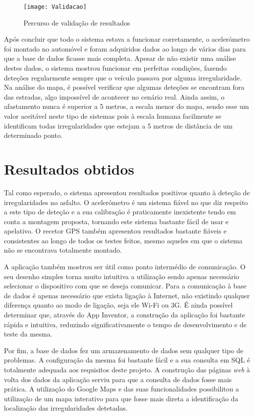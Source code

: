 \begin{figure}[htbp]
	\centering
	\texttt{[image: Validacao]}
	\caption{Percurso de validação de resultados}
	\label{fig:validacao}
\end{figure}

Após concluir que todo o sistema estava a funcionar corretamente, o acelerómetro foi montado no automóvel e foram adquiridos dados ao longo de vários dias para que a base de dados ficasse mais completa.
Apesar de não existir uma análise destes dados, o sistema mostrou funcionar em perfeitas condições, fazendo deteções regularmente sempre que o veículo passava por alguma irregularidade.
Na análise do mapa, é possível verificar que algumas deteções se encontram fora das estradas, algo impossível de acontecer no cenário real.
Ainda assim, o afastamento nunca é superior a 5 metros, a escala menor do mapa, sendo esse um valor aceitável neste tipo de sistemas pois à escala humana facilmente se identificam todas irregularidades que estejam a 5 metros de distância de um determinado ponto.

\section{Resultados obtidos}
\label{sec:resultados}

Tal como esperado, o sistema apresentou resultados positivos quanto à deteção de irregularidades no asfalto.
O acelerómetro é um sistema fiável no que diz respeito a este tipo de deteção e a sua calibração é praticamente inexistente tendo em conta a montagem proposta, tornando este sistema bastante fácil de usar e apelativo.
O recetor GPS também apresentou resultados bastante fiáveis e consistentes ao longo de todos os testes feitos, mesmo aqueles em que o sistema não se encontrava totalmente montado.

A aplicação também mostrou ser útil como ponto intermédio de comunicação.
O seu desenho simples torna muito intuitiva a utilização sendo apenas necessário selecionar o dispositivo com que se deseja comunicar.
Para a comunicação à base de dados é apenas necessário que exista ligação à Internet, não existindo qualquer diferença quanto ao modo de ligação, seja ele Wi-Fi ou 3G.
É ainda possível determinar que, através do App Inventor, a construção da aplicação foi bastante rápida e intuitiva, reduzindo significativamente o tempo de desenvolvimento e de teste da mesma.

Por fim, a base de dados fez um armazenamento de dados sem qualquer tipo de problemas.
A configuração da mesma foi bastante fácil e a sua consulta em SQL é totalmente adequada aos requisitos deste projeto.
A construção das páginas \emph{web} à volta dos dados da aplicação serviu para que a consulta de dados fosse mais prática.
A utilização do Google Maps e das suas funcionalidades possibilitou a utilização de um mapa interativo para que fosse mais direta a identificação da localização das irregularidades detetadas.